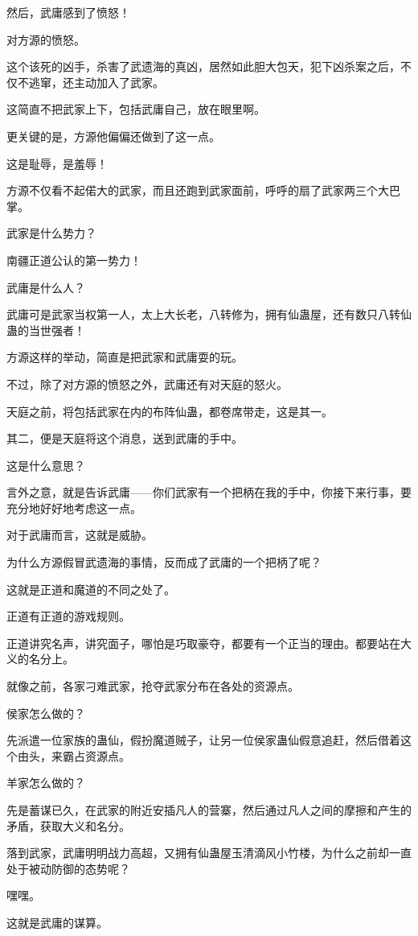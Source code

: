 \begin{this_body}
然后，武庸感到了愤怒！

对方源的愤怒。

这个该死的凶手，杀害了武遗海的真凶，居然如此胆大包天，犯下凶杀案之后，不仅不逃窜，还主动加入了武家。

这简直不把武家上下，包括武庸自己，放在眼里啊。

更关键的是，方源他偏偏还做到了这一点。

这是耻辱，是羞辱！

方源不仅看不起偌大的武家，而且还跑到武家面前，呼呼的扇了武家两三个大巴掌。

武家是什么势力？

南疆正道公认的第一势力！

武庸是什么人？

武庸可是武家当权第一人，太上大长老，八转修为，拥有仙蛊屋，还有数只八转仙蛊的当世强者！

方源这样的举动，简直是把武家和武庸耍的玩。

不过，除了对方源的愤怒之外，武庸还有对天庭的怒火。

天庭之前，将包括武家在内的布阵仙蛊，都卷席带走，这是其一。

其二，便是天庭将这个消息，送到武庸的手中。

这是什么意思？

言外之意，就是告诉武庸——你们武家有一个把柄在我的手中，你接下来行事，要充分地好好地考虑这一点。

对于武庸而言，这就是威胁。

为什么方源假冒武遗海的事情，反而成了武庸的一个把柄了呢？

这就是正道和魔道的不同之处了。

正道有正道的游戏规则。

正道讲究名声，讲究面子，哪怕是巧取豪夺，都要有一个正当的理由。都要站在大义的名分上。

就像之前，各家刁难武家，抢夺武家分布在各处的资源点。

侯家怎么做的？

先派遣一位家族的蛊仙，假扮魔道贼子，让另一位侯家蛊仙假意追赶，然后借着这个由头，来霸占资源点。

羊家怎么做的？

先是蓄谋已久，在武家的附近安插凡人的营寨，然后通过凡人之间的摩擦和产生的矛盾，获取大义和名分。

落到武家，武庸明明战力高超，又拥有仙蛊屋玉清滴风小竹楼，为什么之前却一直处于被动防御的态势呢？

嘿嘿。

这就是武庸的谋算。


\end{this_body}

